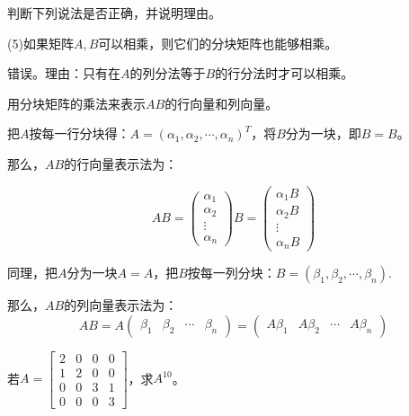 \documentclass[a4paper]{report}
\begin{document}
\EX 判断下列说法是否正确，并说明理由。

(5)如果矩阵$A,B$可以相乘，则它们的分块矩阵也能够相乘。

\begin{jie}
错误。理由：只有在$A$的列分法等于$B$的行分法时才可以相乘。
\end{jie}

\EX 用分块矩阵的乘法来表示$AB$的行向量和列向量。

\begin{jie}
把$A$按每一行分块得：$A=(\alpha_1,\alpha_2,\cdots,\alpha_n)^T$，将$B$分为一块，即$B=B$。

那么，$AB$的行向量表示法为：

\begin{equation*}
  AB=
  \begin{pmatrix}
    \alpha_1\\ \alpha_2\\ \vdots\\ \alpha_n
  \end{pmatrix}B=
  \begin{pmatrix}
    \alpha_1B\\ \alpha_2B\\ \vdots\\ \alpha_nB
  \end{pmatrix}
\end{equation*}

同理，把$A$分为一块$A=A$，把$B$按每一列分块：$B=(\beta_1,\beta_2,\cdots,\beta_n)$.

那么，$AB$的列向量表示法为：
\begin{equation*}
  AB=
  A\begin{pmatrix}
    \beta_1&\beta_2&\cdots&\beta_n
  \end{pmatrix}=
  \begin{pmatrix}
    A\beta_1&A\beta_2&\cdots&A\beta_n
  \end{pmatrix}
\end{equation*}
\end{jie}

\EX 若$
A=
\begin{bmatrix}
2&0&0&0\\
1&2&0&0\\
0&0&3&1\\
0&0&0&3
\end{bmatrix}
$，求$A^{10}$。
\end{document}
